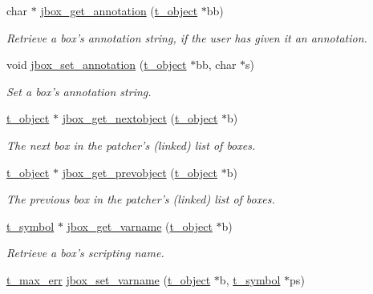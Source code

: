 \begin{DoxyCompactItemize}
char $\ast$ \hyperlink{group__jbox_gae370a9514d4075d00eb6a336d95390b0}{jbox\_\-get\_\-annotation} (\hyperlink{structt__object}{t\_\-object} $\ast$bb)
\begin{DoxyCompactList}\small\item\em Retrieve a box's annotation string, if the user has given it an annotation. \item\end{DoxyCompactList}\item 
void \hyperlink{group__jbox_ga2c9cde3892f9a68be579ea623c438dd0}{jbox\_\-set\_\-annotation} (\hyperlink{structt__object}{t\_\-object} $\ast$bb, char $\ast$s)
\begin{DoxyCompactList}\small\item\em Set a box's annotation string. \item\end{DoxyCompactList}\item 
\hyperlink{structt__object}{t\_\-object} $\ast$ \hyperlink{group__jbox_ga89177ab12d45649c7209e65c97a3b128}{jbox\_\-get\_\-nextobject} (\hyperlink{structt__object}{t\_\-object} $\ast$b)
\begin{DoxyCompactList}\small\item\em The next box in the patcher's (linked) list of boxes. \item\end{DoxyCompactList}\item 
\hyperlink{structt__object}{t\_\-object} $\ast$ \hyperlink{group__jbox_ga99be7a7b57c38335d30e6241afb86a5b}{jbox\_\-get\_\-prevobject} (\hyperlink{structt__object}{t\_\-object} $\ast$b)
\begin{DoxyCompactList}\small\item\em The previous box in the patcher's (linked) list of boxes. \item\end{DoxyCompactList}\item 
\hyperlink{structt__symbol}{t\_\-symbol} $\ast$ \hyperlink{group__jbox_ga0ada31d7aaa4c8e04f0807a3d857a1ad}{jbox\_\-get\_\-varname} (\hyperlink{structt__object}{t\_\-object} $\ast$b)
\begin{DoxyCompactList}\small\item\em Retrieve a box's scripting name. \item\end{DoxyCompactList}\item 
\hyperlink{group__datatypes_ga73edaae82b318855cc09fac994918165}{t\_\-max\_\-err} \hyperlink{group__jbox_gac4f46f657ca5087727fff6999c517d6c}{jbox\_\-set\_\-varname} (\hyperlink{structt__object}{t\_\-object} $\ast$b, \hyperlink{structt__symbol}{t\_\-symbol} $\ast$ps)

\end{DoxyCompactItemize}
